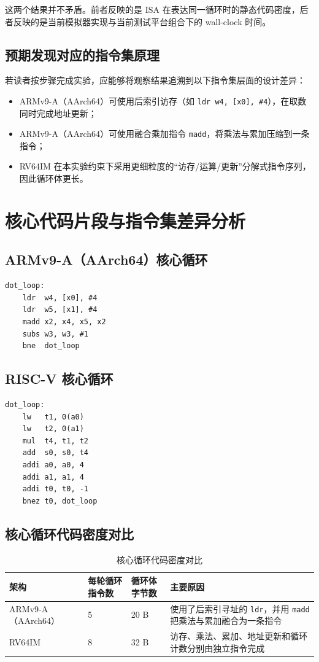 \documentclass{article}
\begin{document}
这两个结果并不矛盾。前者反映的是 ISA 在表达同一循环时的静态代码密度，后者反映的是当前模拟器实现与当前测试平台组合下的 wall-clock 时间。

\subsection{预期发现对应的指令集原理}
若读者按步骤完成实验，应能够将观察结果追溯到以下指令集层面的设计差异：
\begin{itemize}
    \item ARMv9-A（AArch64）可使用后索引访存（如 \texttt{ldr w4, [x0], \#4}），在取数同时完成地址更新；
    \item ARMv9-A（AArch64）可使用融合乘加指令 \texttt{madd}，将乘法与累加压缩到一条指令；
    \item RV64IM 在本实验约束下采用更细粒度的“访存/运算/更新”分解式指令序列，因此循环体更长。
\end{itemize}

\section{核心代码片段与指令集差异分析}
\subsection{ARMv9-A（AArch64）核心循环}
\begin{Verbatim}[frame=single]
dot_loop:
    ldr  w4, [x0], #4
    ldr  w5, [x1], #4
    madd x2, x4, x5, x2
    subs w3, w3, #1
    bne  dot_loop
\end{Verbatim}

\subsection{RISC-V 核心循环}
\begin{Verbatim}[frame=single]
dot_loop:
    lw   t1, 0(a0)
    lw   t2, 0(a1)
    mul  t4, t1, t2
    add  s0, s0, t4
    addi a0, a0, 4
    addi a1, a1, 4
    addi t0, t0, -1
    bnez t0, dot_loop
\end{Verbatim}

\subsection{核心循环代码密度对比}
\begin{table}[H]
    \centering
    \caption{核心循环代码密度对比}
    \begin{tabular}{p{} p{} p{} p{}}
        \toprule
        架构 & 每轮循环指令数 & 循环体字节数 & 主要原因 \\
        \midrule
        ARMv9-A（AArch64） & 5 & 20 B & 使用了后索引寻址的 \texttt{ldr}，并用 \texttt{madd} 把乘法与累加融合为一条指令 \\
        RV64IM & 8 & 32 B & 访存、乘法、累加、地址更新和循环计数分别由独立指令完成 \\
        \bottomrule
    \end{tabular}
\end{table}
\end{document}

